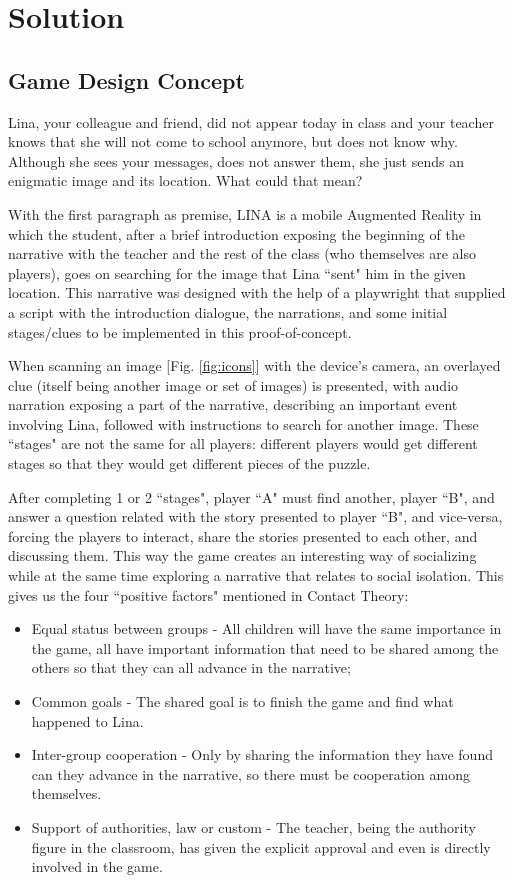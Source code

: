 \documentclass[runningheads]{llncs}
\begin{document}
\newpage
\section{Solution}

\subsection{Game Design Concept}
\par Lina, your colleague and friend, did not appear today in class and your teacher knows that she will not come to school anymore, but does not know why. Although she sees your messages, does not answer them, she just sends an enigmatic image and its location. What could that mean?
\par With the first paragraph as premise, LINA is a mobile Augmented Reality in which the student, after a brief introduction exposing the beginning of the narrative with the teacher and the rest of the class (who themselves are also players), goes on searching for the image that Lina ``sent" him in the given location. This narrative was designed with the help of a playwright that supplied a script with the introduction dialogue, the narrations, and some initial stages/clues to be implemented in this proof-of-concept. 
\par When scanning an image [Fig. \ref{fig:icons}] with the device's camera, an overlayed clue (itself being another image or set of images) is presented, with audio narration exposing a part of the narrative, describing an important event involving Lina, followed with instructions to search for another image. These ``stages" are not the same for all players: different players would get different stages so that they would get different pieces of the puzzle. 
\par After completing 1 or 2 ``stages", player ``A" must find another, player ``B", and answer a question related with the story presented to player ``B", and vice-versa, forcing the players to interact, share the stories presented to each other, and discussing them. This way the game creates an interesting way of socializing while at the same time exploring a narrative that relates to social isolation. This gives us the four ``positive factors" mentioned in Contact Theory:
\begin{itemize}
    \item Equal status between groups - All children will have the same importance in the game, all have important information that need to be shared among the others so that they can all advance in the narrative;
    \item Common goals - The shared goal is to finish the game and find what happened to Lina.
    \item Inter-group cooperation - Only by sharing the information they have found can they advance in the narrative, so there must be cooperation among themselves.
    \item Support of authorities, law or custom - The teacher, being the authority figure in the classroom, has given the explicit approval and even is directly involved in the game.
\end{itemize}
\end{document}
